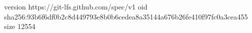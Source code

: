 version https://git-lfs.github.com/spec/v1
oid sha256:93b6f6df0b2c8d449793e8b0b6cedea8a35144a676b26fe410f97fc0a3cea455
size 12554
